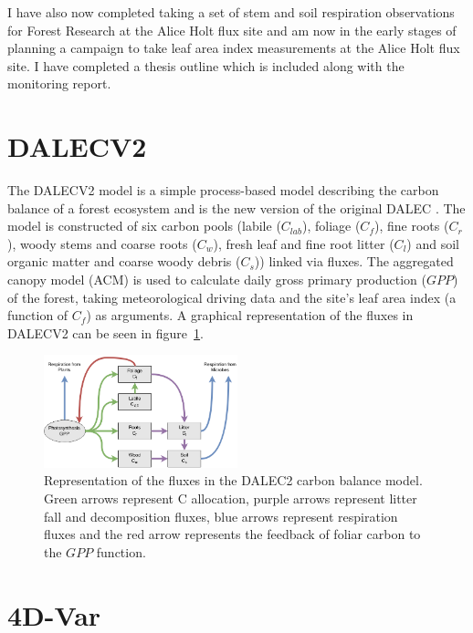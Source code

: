 \documentclass[11pt]{article}
\begin{document}
I have also now completed taking a set of stem and soil respiration observations for Forest Research at the Alice Holt flux site and am now in the early stages of planning a campaign to take leaf area index measurements at the Alice Holt flux site. I have completed a thesis outline which is included along with the monitoring report.            

\section{DALECV2}

The DALECV2 model is a simple process-based model describing the carbon balance of a forest ecosystem \citep{Bloom2014} and is the new version of the original DALEC \citep{williams2005improved}. The model is constructed of six carbon pools (labile ($C_{lab}$), foliage ($C_f$), fine roots ($C_r$), woody stems and coarse roots ($C_w$), fresh leaf and fine root litter ($C_l$) and soil organic matter and coarse woody debris ($C_s$)) linked via fluxes. The aggregated canopy model (ACM) \citep{williams1997predicting} is used to calculate daily gross primary production ($GPP$) of the forest, taking meteorological driving data and the site's leaf area index (a function of $C_f$) as arguments. A graphical representation of the fluxes in DALECV2 can be seen in figure~\ref{fig:DALEC_mod}.   

\begin{figure}[ht]
    \centering
    \includegraphics[width=0.5\textwidth]{Dalecdiagram.png}
    \caption{Representation of the fluxes in the DALEC2 carbon balance model. Green arrows represent C allocation, purple arrows represent litter fall and decomposition fluxes, blue arrows represent respiration fluxes and the red arrow represents the feedback of foliar carbon to the $GPP$ function.}
    \label{fig:DALEC_mod}
\end{figure}

\section{4D-Var}
\end{document}
